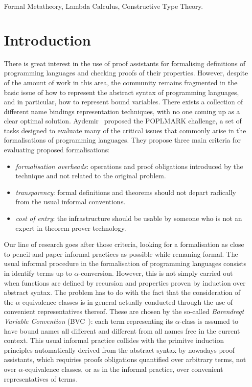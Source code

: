 \documentclass[preprint,10pt]{sigplanconf}
\begin{document}


\keywords
Formal Metatheory, Lambda Calculus, Constructive Type Theory.

\section{Introduction}

There is great interest in the use of proof assistants for formalising definitions of programming languages and checking proofs of their properties. However, despite of the amount of work in this area, the community remains fragmented in the basic issue of how to represent the abstract syntax of programming languages, and in particular, how to represent bound variables. There exists a collection of different name bindings representation techniques, with no one coming up as a clear optimal solution. Aydemir~\cite{Aydemir2005} proposed the POPLMARK challenge, a set of tasks designed to evaluate many of the critical issues that commonly arise in the formalisations of programming languages. They propose three main criteria for evaluating proposed formalisations:

\begin{itemize}
\item \emph{formalisation overheads}: operations and proof obligations introduced by the technique and not related to the original problem.
\item \emph{transparency}: formal definitions and theorems should not depart radically from the usual informal conventions.
\item \emph{cost of entry}: the infrastructure should be usable by someone who is not an expert in theorem prover technology.
\end{itemize}



Our line of research goes after those criteria, looking for a formalisation as close to pencil-and-paper informal practices as possible while remaning formal. The usual informal procedure in the formalisation of programming languages consists in  identify terms up to $\alpha$-conversion. However, this is not simply carried out when functions are defined by recursion and properties proven by induction over abstract syntax. The problem has to do with the fact that the consideration of the $\alpha$-equivalence classes is in general actually conducted through the use of convenient representatives thereof. These are chosen by the so-called \emph{Barendregt Variable Convention} (BVC~\cite{bar84:lambda}): each term representing its $\alpha$-class is assumed to have bound names all different and different from all names free in the current context. This usual informal practice collides with the primitve induction principles automatically derived from the abstract syntax by nowadays proof assistants, which requiries proofs obligations quantified over arbitrary terms, not over $\alpha$-equivalence classes, or as in the informal practice, over convenient representatives of terms.
\end{document}
